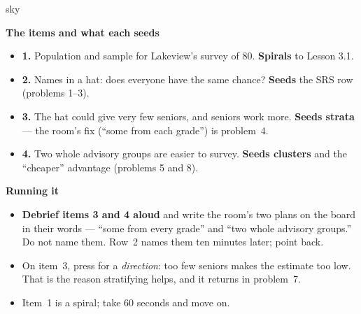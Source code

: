 \documentclass[10pt]{article}
\begin{document}
\boxguard[20]
\begin{skillbox}{sky}
\begin{minipage}[t]{0.48\linewidth}
    \textbf{The items and what each seeds}
    \begin{itemize}
        \item \textbf{1.} Population and sample for Lakeview's survey of 80. \textbf{Spirals}
              to Lesson 3.1.
        \item \textbf{2.} Names in a hat: does everyone have the same chance? \textbf{Seeds}
              the SRS row (problems 1--3).
        \item \textbf{3.} The hat could give very few seniors, and seniors work more.
              \textbf{Seeds strata} --- the room's fix (``some from each grade'') is problem~4.
        \item \textbf{4.} Two whole advisory groups are easier to survey. \textbf{Seeds
              clusters} and the ``cheaper'' advantage (problems 5 and 8).
    \end{itemize}
\end{minipage}
\hfill
\begin{minipage}[t]{0.48\linewidth}
    \textbf{Running it}
    \begin{itemize}
        \item \textbf{Debrief items 3 and 4 aloud} and write the room's two plans on the board in
              their words --- ``some from every grade'' and ``two whole advisory groups.'' Do not
              name them. Row~2 names them ten minutes later; point back.
        \item On item~3, press for a \emph{direction}: too few seniors makes the estimate too
              low. That is the reason stratifying helps, and it returns in problem~7.
        \item Item~1 is a spiral; take 60 seconds and move on.
    \end{itemize}
\end{minipage}
\end{skillbox}
\end{document}
